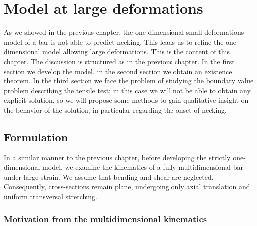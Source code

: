 \documentclass[a4paper,10pt,twoside]{amsbook}
\numberwithin{section}{chapter}
\numberwithin{equation}{chapter}
\theoremstyle{definition}
\begin{document}
\chapter{Model at large deformations}
\label{chap:large-neck}

As we showed in the previous chapter, the one-dimensional small deformations model of a bar is not able to predict necking. This leads us to refine the one dimensional model allowing large deformations. This is the content of this chapter. The discussion is structured as in the previous chapter. In the first section we develop the model, in the second section we obtain an existence theorem. In the third section we face the problem of studying the boundary value problem describing the tensile test: in this case we will not be able to obtain any explicit solution, so we will propose some methods to gain qualitative insight on the behavior of the solution, in particular regarding the onset of necking.

\section{Formulation}

In a similar manner to the previous chapter, before developing the strictly one-dimensional model, we examine the kinematics of a fully multidimensional bar under large strain. We assume that bending and shear are neglected. Consequently, cross-sections remain plane, undergoing only axial translation and uniform transversal stretching.

\subsection{Motivation from the multidimensional kinematics}
\label{subsec:motivation-large}
\end{document}
